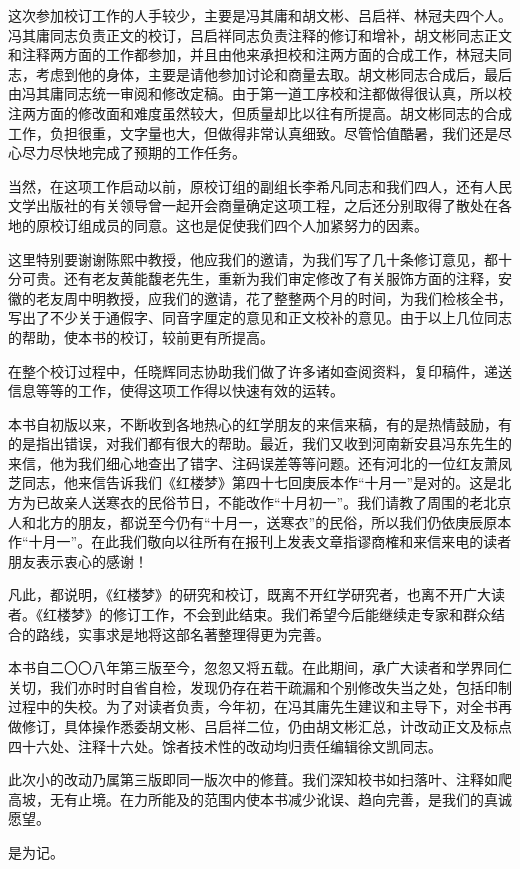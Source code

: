\par 这次参加校订工作的人手较少，主要是冯其庸和胡文彬、吕启祥、林冠夫四个人。冯其庸同志负责正文的校订，吕启祥同志负责注释的修订和增补，胡文彬同志正文和注释两方面的工作都参加，并且由他来承担校和注两方面的合成工作，林冠夫同志，考虑到他的身体，主要是请他参加讨论和商量去取。胡文彬同志合成后，最后由冯其庸同志统一审阅和修改定稿。由于第一道工序校和注都做得很认真，所以校注两方面的修改面和难度虽然较大，但质量却比以往有所提高。胡文彬同志的合成工作，负担很重，文字量也大，但做得非常认真细致。尽管恰值酷暑，我们还是尽心尽力尽快地完成了预期的工作任务。
\par 当然，在这项工作启动以前，原校订组的副组长李希凡同志和我们四人，还有人民文学出版社的有关领导曾一起开会商量确定这项工程，之后还分别取得了散处在各地的原校订组成员的同意。这也是促使我们四个人加紧努力的因素。
\par 这里特别要谢谢陈熙中教授，他应我们的邀请，为我们写了几十条修订意见，都十分可贵。还有老友黄能馥老先生，重新为我们审定修改了有关服饰方面的注释，安徽的老友周中明教授，应我们的邀请，花了整整两个月的时间，为我们检核全书，写出了不少关于通假字、同音字厘定的意见和正文校补的意见。由于以上几位同志的帮助，使本书的校订，较前更有所提高。
\par 在整个校订过程中，任晓辉同志协助我们做了许多诸如查阅资料，复印稿件，递送信息等等的工作，使得这项工作得以快速有效的运转。
\par 本书自初版以来，不断收到各地热心的红学朋友的来信来稿，有的是热情鼓励，有的是指出错误，对我们都有很大的帮助。最近，我们又收到河南新安县冯东先生的来信，他为我们细心地查出了错字、注码误差等等问题。还有河北的一位红友萧凤芝同志，他来信告诉我们《红楼梦》第四十七回庚辰本作“十月一”是对的。这是北方为已故亲人送寒衣的民俗节日，不能改作“十月初一”。我们请教了周围的老北京人和北方的朋友，都说至今仍有“十月一，送寒衣”的民俗，所以我们仍依庚辰原本作“十月一”。在此我们敬向以往所有在报刊上发表文章指谬商榷和来信来电的读者朋友表示衷心的感谢！
\par 凡此，都说明，《红楼梦》的研究和校订，既离不开红学研究者，也离不开广大读者。《红楼梦》的修订工作，不会到此结束。我们希望今后能继续走专家和群众结合的路线，实事求是地将这部名著整理得更为完善。
\par {}
\par {}
\par 本书自二〇〇八年第三版至今，忽忽又将五载。在此期间，承广大读者和学界同仁关切，我们亦时时自省自检，发现仍存在若干疏漏和个别修改失当之处，包括印制过程中的失校。为了对读者负责，今年初，在冯其庸先生建议和主导下，对全书再做修订，具体操作悉委胡文彬、吕启祥二位，仍由胡文彬汇总，计改动正文及标点四十六处、注释十六处。馀者技术性的改动均归责任编辑徐文凯同志。
\par 此次小的改动乃属第三版即同一版次中的修葺。我们深知校书如扫落叶、注释如爬高坡，无有止境。在力所能及的范围内使本书减少讹误、趋向完善，是我们的真诚愿望。
\par 是为记。
\par {}
\par {}

